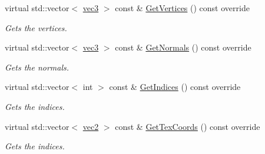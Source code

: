 \begin{DoxyCompactItemize}
virtual std\+::vector$<$ \hyperlink{_types_8h_a3d0ce73e3199de81565fb01632415288}{vec3} $>$ const \& \hyperlink{class_terrain_aad119025aad6316288e8bd07eb309552}{Get\+Vertices} () const  override
\begin{DoxyCompactList}\small\item\em Gets the vertices. \end{DoxyCompactList}\item 
virtual std\+::vector$<$ \hyperlink{_types_8h_a3d0ce73e3199de81565fb01632415288}{vec3} $>$ const \& \hyperlink{class_terrain_aef83808bbeac9305c35711acfe078fd5}{Get\+Normals} () const  override
\begin{DoxyCompactList}\small\item\em Gets the normals. \end{DoxyCompactList}\item 
virtual std\+::vector$<$ int $>$ const \& \hyperlink{class_terrain_adeef11f1e39c3bf980c2a80a88f41375}{Get\+Indices} () const  override
\begin{DoxyCompactList}\small\item\em Gets the indices. \end{DoxyCompactList}\item 
virtual std\+::vector$<$ \hyperlink{_types_8h_a43182e59794291f6ab00e51b160706c2}{vec2} $>$ const \& \hyperlink{class_terrain_aa3e0c354c5a81b17a55e2a91bf7b5f9f}{Get\+Tex\+Coords} () const  override
\begin{DoxyCompactList}\small\item\em Gets the indices. \end{DoxyCompactList}\end{DoxyCompactItemize}
